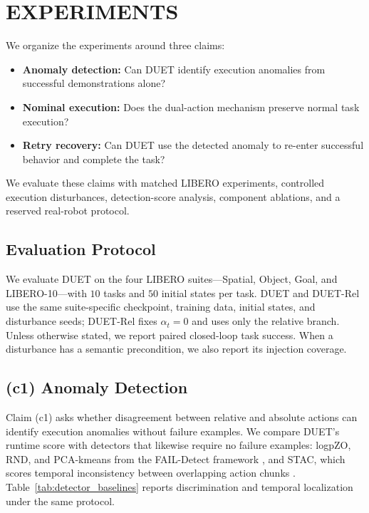 \documentclass[letterpaper, 10 pt, conference]{ieeeconf}
\begin{document}
\section{EXPERIMENTS}
We organize the experiments around three claims:
\begin{itemize}
    \item[(c1)] \textbf{Anomaly detection:} Can DUET identify execution anomalies from successful demonstrations alone?
    \item[(c2)] \textbf{Nominal execution:} Does the dual-action mechanism preserve normal task execution?
    \item[(c3)] \textbf{Retry recovery:} Can DUET use the detected anomaly to re-enter successful behavior and complete the task?
\end{itemize}
We evaluate these claims with matched LIBERO experiments, controlled execution disturbances, detection-score analysis, component ablations, and a reserved real-robot protocol.

\subsection{Evaluation Protocol}
We evaluate DUET on the four LIBERO suites---Spatial, Object, Goal, and LIBERO-10---with $10$ tasks and $50$ initial states per task. DUET and DUET-Rel use the same suite-specific checkpoint, training data, initial states, and disturbance seeds; DUET-Rel fixes $\alpha_t=0$ and uses only the relative branch. Unless otherwise stated, we report paired closed-loop task success. When a disturbance has a semantic precondition, we also report its injection coverage.

\subsection{(c1) Anomaly Detection}
Claim (c1) asks whether disagreement between relative and absolute actions can identify execution anomalies without failure examples. We compare DUET's runtime score with detectors that likewise require no failure examples: logpZO, RND, and PCA-kmeans from the FAIL-Detect framework \cite{faildetect}, and STAC, which scores temporal inconsistency between overlapping action chunks \cite{sentinel}. Table~\ref{tab:detector_baselines} reports discrimination and temporal localization under the same protocol.
\end{document}
